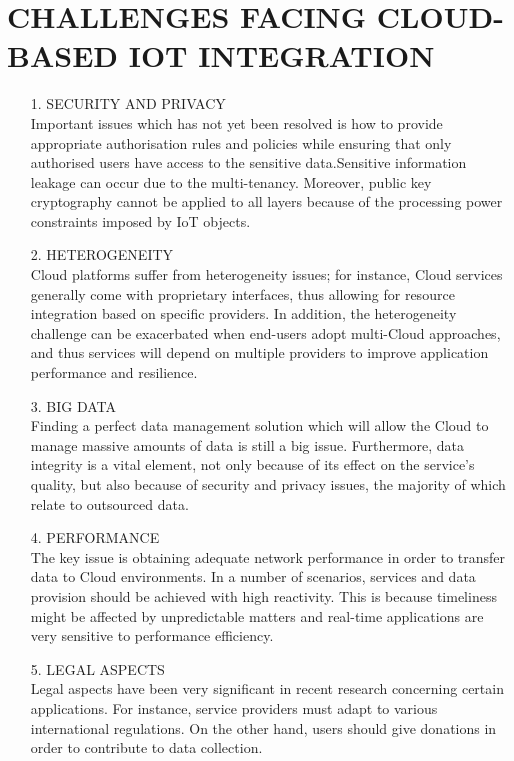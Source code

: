 \documentclass[11pt]{article}
\begin{document}
\section{CHALLENGES FACING CLOUD-BASED IOT INTEGRATION}
\begin{itemize}
\item[1.]SECURITY AND PRIVACY\\
Important issues which has not yet been resolved is how to provide appropriate authorisation rules and policies while ensuring that only authorised users have access to the sensitive data.Sensitive information leakage can occur due to the multi-tenancy. Moreover, public key cryptography cannot be applied to all layers because of the processing power constraints imposed by IoT objects.
\item[2.]HETEROGENEITY\\
 Cloud platforms suffer from heterogeneity issues; for instance, Cloud services generally come with proprietary interfaces, thus allowing for resource integration based on specific providers. In addition, the heterogeneity challenge can be exacerbated when end-users adopt multi-Cloud approaches, and thus services will depend on multiple providers to improve application performance and resilience.
\item[3.]BIG DATA\\
Finding a perfect data management solution which will allow the Cloud to manage massive amounts of data is still a big issue. Furthermore, data integrity is a vital element, not only because of its effect on the service’s quality, but also because of security and privacy issues, the majority of which relate to outsourced data. 
\item[4.]PERFORMANCE\\
 The key issue is obtaining adequate network performance in order to transfer data to Cloud environments. In a number of scenarios, services and data provision should be achieved with high reactivity. This is because timeliness might be affected by unpredictable matters and real-time applications are very sensitive to performance efficiency.
 \item[5.]LEGAL ASPECTS \\
 Legal aspects have been very significant in recent research
concerning certain applications. For instance, service providers must adapt to various international regulations. On the other hand, users should give donations in order to contribute to data collection. 


\end{itemize}
\end{document}
